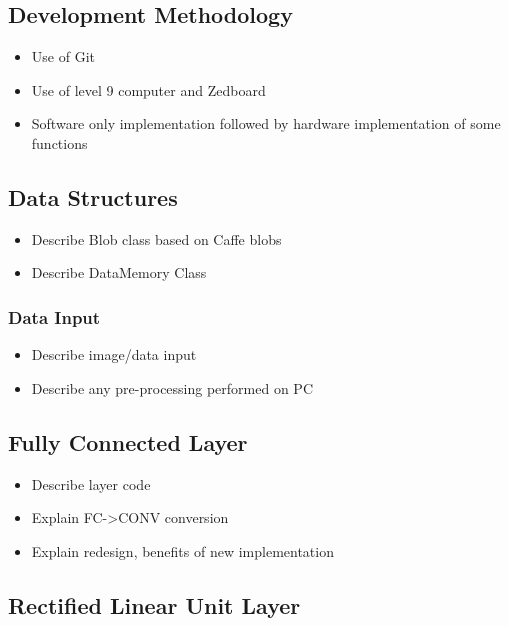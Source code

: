 \documentclass[12pt]{article}
\begin{document}
\subsection{Development Methodology}
\label{sec:Imp-Devlopment}


\begin{itemize}
\item Use of Git
\item Use of level 9 computer and Zedboard
\item Software only implementation followed by hardware implementation of some functions
\end{itemize}

\subsection{Data Structures}
\label{sec:Imp-blobs}


\begin{itemize}
\item Describe Blob class based on Caffe blobs
\item Describe DataMemory Class
\end{itemize}

\subsubsection{Data Input}
\label{sec:Imp-Input}


\begin{itemize}
\item Describe image/data input
\item Describe any pre-processing performed on PC
\end{itemize}


\subsection{Fully Connected Layer}
\label{sec:Imp-FC}


\begin{itemize}
\item Describe layer code
\item Explain FC->CONV conversion
\item Explain redesign, benefits of new implementation
\end{itemize}

\subsection{Rectified Linear Unit Layer}
\label{sec:Imp-Relu}
\end{document}
